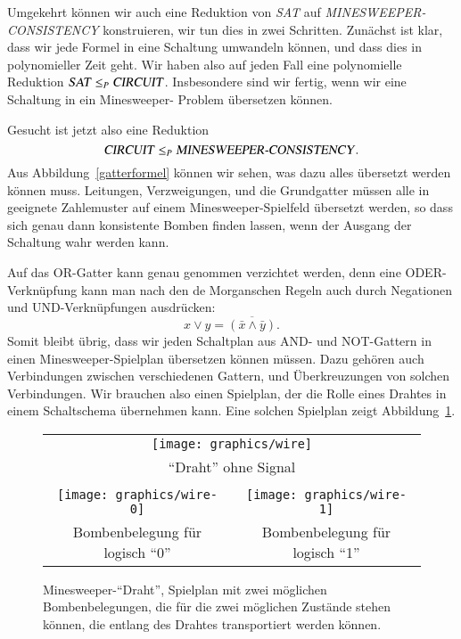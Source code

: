Umgekehrt können wir auch eine Reduktion von \textsl{SAT} auf
\textsl{MINESWEEPER-CONSISTENCY} konstruieren, wir tun dies in
zwei Schritten.
Zunächst ist
klar, dass wir jede Formel in eine Schaltung umwandeln können, und
dass dies in polynomieller Zeit geht. Wir haben also auf jeden
Fall eine polynomielle Reduktion $\text{\textsl{SAT}}\le_P\text{\textsl{CIRCUIT}}$.
Insbesondere sind wir fertig, wenn wir eine Schaltung in ein Minesweeper-%
Problem übersetzen können.

Gesucht ist jetzt also eine Reduktion 
\[
\text{\textsl{CIRCUIT}} \le_P \text{\textsl{MINESWEEPER-CONSISTENCY}}.
\]
Aus Abbildung~\ref{gatterformel} können wir sehen, was dazu alles
übersetzt werden können muss. Leitungen, Verzweigungen, und die Grundgatter
müssen alle in geeignete Zahlemuster auf einem Minesweeper-Spielfeld
übersetzt werden, so dass sich genau dann konsistente Bomben
finden lassen, wenn der Ausgang der Schaltung wahr werden kann.

Auf das OR-Gatter kann genau genommen verzichtet werden, denn eine
ODER-Verknüpfung kann man nach den de Morganschen Regeln auch durch
Negationen und UND-Verknüpfungen ausdrücken:
\[
x\vee y = \overline{(\bar x \wedge \bar y)}.
\]
Somit bleibt übrig, dass wir jeden Schaltplan aus AND- und NOT-Gattern
in einen Minesweeper-Spielplan übersetzen können müssen. Dazu gehören
auch Verbindungen zwischen verschiedenen Gattern, und Überkreuzungen von
solchen Verbindungen. Wir brauchen also einen Spielplan, der die Rolle
eines Drahtes in einem Schaltschema übernehmen kann. Eine solchen Spielplan
zeigt Abbildung~\ref{minesweeper-wire}.

\begin{figure}
\begin{center}
\begin{tabular}{cc}
\multicolumn{2}{c}{\texttt{[image: graphics/wire]}}\\
\multicolumn{2}{c}{``Draht'' ohne Signal}\\
&\\
\texttt{[image: graphics/wire-0]}&
\texttt{[image: graphics/wire-1]}\\
Bombenbelegung für logisch ``0''&
Bombenbelegung für logisch ``1''
\end{tabular}
\end{center}
\caption{Minesweeper-``Draht'', Spielplan mit zwei möglichen Bombenbelegungen,
die für die zwei möglichen Zustände stehen können, die entlang des
Drahtes transportiert werden können.\label{minesweeper-wire}}
\end{figure}%

